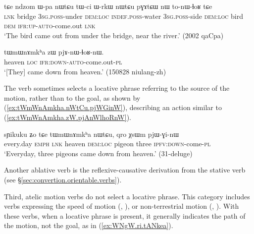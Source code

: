 \begin{exe}
\ex \label{ex:Wpa.nWtCu.tonWlhoR}
\gll  tɕe ndzom ɯ-pa nɯtɕu tɯ-ci ɯ-rkɯ nɯtɕu pɣɤtɕɯ nɯ to-nɯ-ɬoʁ tɕe \\
\textsc{lnk} bridge \textsc{3sg}.\textsc{poss}-under \textsc{dem}:\textsc{loc} \textsc{indef}.\textsc{poss}-water \textsc{3sg}.\textsc{poss}-side \textsc{dem}:\textsc{loc} bird \textsc{dem} \textsc{ifr}:\textsc{up}-\textsc{auto}-come.out \textsc{lnk} \\
\glt  `The bird came out from under the bridge, near the river.' (2002 qaCpa)
\end{exe}

\begin{exe}
\ex \label{ex:tWmWnAmkha.zW.pjAnWlhoRnW}
\gll  tɯmɯnɤmkʰa zɯ pjɤ-nɯ-ɬoʁ-nɯ. \\
heaven \textsc{loc} \textsc{ifr}:\textsc{down}-\textsc{auto}-come.out-\textsc{pl} \\
\glt `[They] came down from heaven.' (150828 niulang-zh) 
\end{exe}

The verb  sometimes selects a locative phrase referring to the source of the motion, rather than to the goal, as shown by (\ref{ex:tWmWnAmkha.nWtCu.pjWGinW}), describing an action similar to (\ref{ex:tWmWnAmkha.zW.pjAnWlhoRnW}).

\begin{exe}
\ex \label{ex:tWmWnAmkha.nWtCu.pjWGinW}
\gll sɲikuku ʑo tɕe tɯmɯnɤmkʰa nɯtɕu, qro χsɯm pjɯ-ɣi-nɯ \\
every.day \textsc{emph} \textsc{lnk} heaven \textsc{dem}:\textsc{loc} pigeon three \textsc{ipfv}:\textsc{down}-come-\textsc{pl} \\
\glt `Everyday, three pigeons came down from heaven.' (31-deluge)
\end{exe}

Another ablative verb is the reflexive-causative  derivation from the stative verb   (see §\ref{sec:convertion.orientable.verbs}).

Third, atelic motion verbs do not select a locative phrase. This category includes verbs expressing the speed of motion (, ), or non-ter\-res\-trial motion (, ). With these verbs, when a locative phrase is present, it generally indicates the path of the motion, not the goal, as in (\ref{ex:WNgW.ri.tANkea}).

